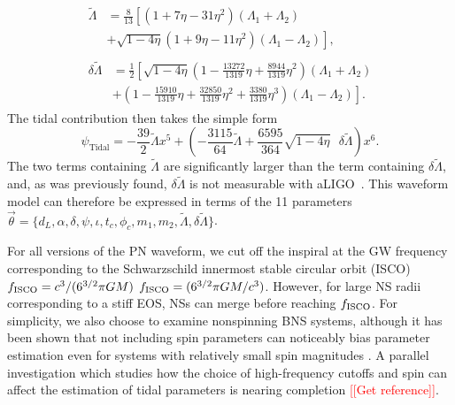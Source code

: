 \documentclass[twocolumn,prd,amssymb,aps,nofootinbib,showpacs,epsf]{revtex4}
\newcommand{\red}{\textcolor{red}}
\newcommand\les[2]{\textcolor{blue}{{#1}\sout{#2}}}
\begin{document}
\begin{align}
\begin{split}
\label{eq:LT}
\tilde{\Lambda}&=\frac{8}{13}\left[\left(1+7\eta-31\eta^2\right)\left(\Lambda_1+\Lambda_2\right)\right.\\
&+ \left.\sqrt{1-4\eta}\left(1+9\eta-11\eta^2\right)\left(\Lambda_1-\Lambda_2\right)\right],
\end{split}\\
\begin{split}
\label{eq:dLT}
\delta\tilde{\Lambda}&=\frac{1}{2}\left[\sqrt{1-4\eta}\left(1-\frac{13272}{1319}\eta+\frac{8944}{1319}\eta^2\right)\left(\Lambda_1+\Lambda_2\right) \right .\\
& + \left . \left(1-\frac{15910}{1319}\eta+\frac{32850}{1319}\eta^2+\frac{3380}{1319}\eta^3\right)\left(\Lambda_1-\Lambda_2\right)\right].
\end{split}
\end{align}
The tidal contribution then takes the simple form
\begin{equation}
\label{eq:psi_tidal}
\psi_\text{Tidal} = -\frac{39}{2}\tilde{\Lambda} x^5+ \left(-\frac{3115}{64}\tilde{\Lambda}+\frac{6595}{364}\sqrt{1-4\eta}\mbox{ }\delta\tilde{\Lambda}\right) x^6.
\end{equation}
The two terms containing $\tilde\Lambda$ are significantly larger than the term containing $\delta\tilde\Lambda$, and, as was previously found, $\delta\tilde\Lambda$ is not measurable with aLIGO~\cite{WadeCreightonOchsner2014}. This waveform model can therefore be expressed in terms of the 11 parameters $\vec\theta = \{d_L, \alpha, \delta, \psi, \iota, t_c, \phi_c, m_1, m_2, \tilde\Lambda, \delta\tilde\Lambda\}$.

For all versions of the PN waveform, we cut off the inspiral at the GW frequency corresponding to the Schwarzschild innermost stable circular orbit (ISCO) \les{$f_{\rm ISCO}=c^3/(6^{3/2}\pi G M)$ }{$f_{\rm ISCO}=(6^{3/2}\pi G M/c^3)$}.  However, for large NS radii corresponding to a stiff EOS, NSs can merge before reaching $f_{\rm ISCO}$. For simplicity, we also choose to examine nonspinning BNS systems, although it has been shown that not including spin parameters can noticeably bias parameter estimation even for systems with relatively small spin magnitudes \cite{Favata2014}. A parallel investigation which studies how the choice of high-frequency cutoffs and spin can affect the estimation of tidal parameters is nearing completion \cite{Nikhef_paper_2} \red{[[Get reference]]}.
\end{document}
